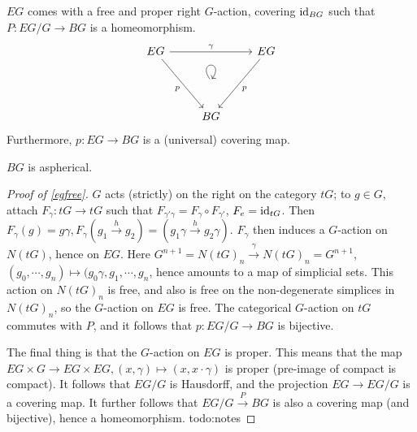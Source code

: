 \begin{theorem}\label{egfree} 
   $EG$ comes with a free and proper right $G$-action, covering $\operatorname{id}_{BG} $ such that $P \colon EG /G \to BG$ is a homeomorphism.
\[
\begin{tikzcd}
EG \arrow[rr, "\gamma"] \arrow[rdd, "p"'] &                                               & EG \arrow[ldd, "p"] \\
                                          & {} \arrow[loop, distance=2em, in=55, out=125] &                     \\
                                          & BG                                            &                    
\end{tikzcd}
\] 
   Furthermore, $p \colon EG \to BG$ is a (universal) covering map.
\end{theorem}
\begin{cor}
    $BG$ is aspherical.
\end{cor}
\begin{proof}[Proof of \cref{egfree}] 
    $G$ acts (strictly) on the right on the category $tG$; to $g \in G$, attach $F_{\gamma }\colon tG \to tG$ such that $F_{\gamma '\gamma }=F_{\gamma }\circ F_{\gamma '}$, $F_e=\operatorname{id}_{tG}$. Then $F_{\gamma }(g)=g\gamma , F_{\gamma }(g_1 \xrightarrow hg_2)=(g_1 \gamma  \xrightarrow h g_2\gamma )$. $F_{\gamma }$ then induces a $G$-action on $N(tG)$, hence on $EG$. Here $G^{n+1}=N(tG)_n  \xrightarrow{\gamma } N(tG)_n =G^{n+1}$, $(g_0,\cdots ,g_n ) \mapsto (g_0 \gamma , g_1, \cdots ,g_n $, hence amounts to a map of simplicial sets. This action on $N(tG)_n $ is free, and also is free on the non-degenerate simplices in $N(tG)_n $, so the $G$-action on $EG$ is free. The categorical $G$-action on $tG$ commutes with $P$, and it follows that $p \colon EG /G \to BG$ is bijective. 

    The final thing is that the $G$-action on $EG$ is proper. This means that the map $EG \times G \to EG \times EG, (x,\gamma ) \mapsto (x, x\cdot \gamma )$ is proper (pre-image of compact is compact). It follows that $EG /G$ is Hausdorff, and the projection $EG \to EG /G$ is a covering map. It further follows that $EG /G \xrightarrow P BG$ is also a covering map (and bijective), hence a homeomorphism. {\color{red}todo:notes} 
\end{proof}
